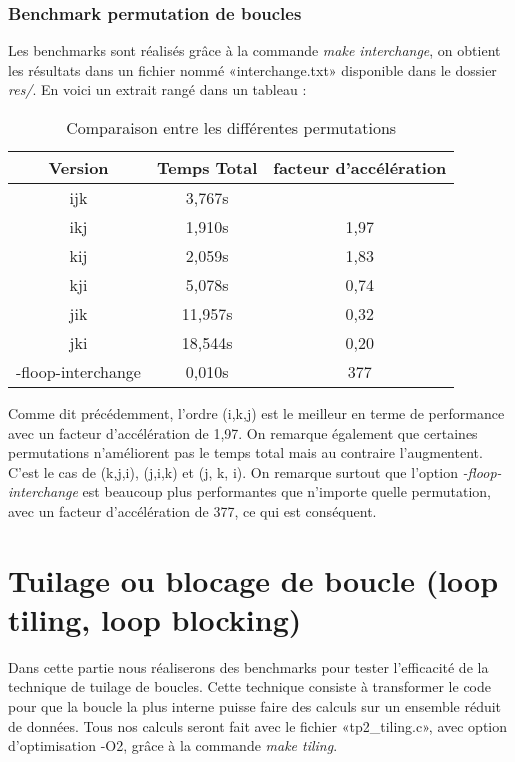 \documentclass{rapport}
\begin{document}
\section{Benchmark permutation de boucles}
Les benchmarks sont réalisés grâce à la commande \textit{make interchange}, on obtient les résultats dans un fichier nommé «interchange.txt» disponible dans le dossier \textit{res/}. En voici un extrait rangé dans un tableau :
\begin{table}[H]
    \centering
    \begin{tabular}{|c|c|c|}
        \hline
        Version & Temps Total & facteur d'accélération \\
        \hline
        ijk & 3,767s & \diagbox{}{} \\
        \hline
        ikj & 1,910s & 1,97 \\
        \hline
        kij & 2,059s & 1,83 \\
        \hline
        kji & 5,078s & 0,74 \\
        \hline
        jik & 11,957s & 0,32 \\
        \hline
        jki & 18,544s & 0,20 \\
        \hline
        -floop-interchange & 0,010s & 377 \\
        \hline
    \end{tabular}
    \caption{Comparaison entre les différentes permutations}
\end{table}

Comme dit précédemment, l'ordre (i,k,j) est le meilleur en terme de performance avec un facteur d'accélération de 1,97. On remarque également que certaines permutations n'améliorent pas le temps total mais au contraire l'augmentent. C'est le cas de (k,j,i), (j,i,k) et (j, k, i). On remarque surtout que l'option \textit{-floop-interchange} est beaucoup plus performantes que n'importe quelle permutation, avec un facteur d'accélération de 377, ce qui est conséquent. 
\clearpage
\part{Tuilage ou blocage de boucle (loop tiling, loop blocking)}\setcounter{section}{0}
Dans cette partie nous réaliserons des benchmarks pour tester l'efficacité de la technique de tuilage de boucles.
Cette technique consiste à transformer le code pour que la boucle la plus interne puisse faire des calculs sur un ensemble réduit de données. Tous nos calculs seront fait avec le fichier «tp2\_tiling.c», avec option d'optimisation -O2, grâce à la commande \textit{make tiling}.
\end{document}
